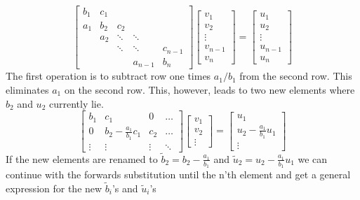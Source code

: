 \documentclass[10pt,a4paper]{article}
\begin{document}
    \[
    \begin{bmatrix}
    b_1 & c_1 &  &  &  \\ 
    a_1 & b_2 & c_2 &  &  \\ 
    & a_2 & \ddots & \ddots &  \\ 
    &  & \ddots & \ddots & c_{n-1} \\ 
    &  &  & a_{n-1} & b_n
    \end{bmatrix}
    \begin{bmatrix}
	    v_1 \\ 
	    v_2 \\ 
	    \vdots \\ 
	    v_{n-1} \\ 
	    v_n
    \end{bmatrix} =
    \begin{bmatrix}
	    u_1 \\ 
	    u_2 \\ 
	    \vdots \\ 
	    u_{n-1} \\ 
	    u_n
    \end{bmatrix} 
    \]
    The first operation is to subtract row one times $a_1/b_1$ from the second row. This eliminates $a_1$ on the second row. This, however, leads to two new elements where $b_2$ and $u_2$ currently lie.
    \[
    \begin{bmatrix}
        b_1 & c_1 & 0 & \dots\\
        0 & b_2-\tfrac{a_1}{b_1}c_1 & c_2 & \dots\\
        \vdots & \vdots & \vdots & \ddots
    \end{bmatrix}
    \begin{bmatrix}
        v_1\\
        v_2\\
        \vdots
    \end{bmatrix}
    =
    \begin{bmatrix}
        u_1\\
        u_2-\tfrac{a_1}{b_1}u_1\\
        \vdots
    \end{bmatrix}
    \]
    If the new elements are renamed to $\tilde{b}_2 = b_2-\tfrac{a_1}{b_1} $ and $\tilde{u}_2 = u_2-\tfrac{a_1}{b_1}u_1$ we can continue with the forwards substitution until the n'th element and get a general expression for the new $\tilde{b}_i$'s and $\tilde{u}_i$'s
\end{document}
